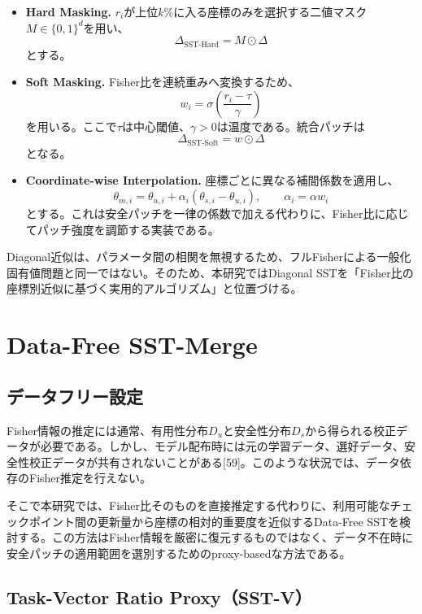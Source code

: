 \documentclass{article}
\begin{document}
\begin{itemize}
\item \textbf{Hard Masking.}
  \(r_i\)が上位\(k\%\)に入る座標のみを選択する二値マスク\(M\in\{0,1\}^d\)を用い、
  \[
  \Delta_{\mathrm{SST\text{-}Hard}}
  =
  M\odot\Delta
  \]
  とする。

\item \textbf{Soft Masking.}
  Fisher比を連続重みへ変換するため、
  \[
  w_i
  =
  \sigma\left(
  \frac{r_i-\tau}{\gamma}
  \right)
  \]
  を用いる。ここで\(\tau\)は中心閾値、\(\gamma>0\)は温度である。統合パッチは
  \[
  \Delta_{\mathrm{SST\text{-}Soft}}
  =
  w\odot\Delta
  \]
  となる。

\item \textbf{Coordinate-wise Interpolation.}
  座標ごとに異なる補間係数を適用し、
  \[
  \theta_{m,i}
  =
  \theta_{u,i}
  +
  \alpha_i(\theta_{s,i}-\theta_{u,i}),
  \qquad
  \alpha_i=\alpha w_i
  \]
  とする。これは安全パッチを一律の係数で加える代わりに、Fisher比に応じてパッチ強度を調節する実装である。
\end{itemize}

Diagonal近似は、パラメータ間の相関を無視するため、フルFisherによる一般化固有値問題と同一ではない。そのため、本研究ではDiagonal SSTを「Fisher比の座標別近似に基づく実用的アルゴリズム」と位置づける。

\section{Data-Free SST-Merge}
\label{app:data-free-sst}

\subsection{データフリー設定}

Fisher情報の推定には通常、有用性分布\(D_u\)と安全性分布\(D_s\)から得られる校正データが必要である。しかし、モデル配布時には元の学習データ、選好データ、安全性校正データが共有されないことがある[59]。このような状況では、データ依存のFisher推定を行えない。

そこで本研究では、Fisher比そのものを直接推定する代わりに、利用可能なチェックポイント間の更新量から座標の相対的重要度を近似するData-Free SSTを検討する。この方法はFisher情報を厳密に復元するものではなく、データ不在時に安全パッチの適用範囲を選別するためのproxy-basedな方法である。

\subsection{Task-Vector Ratio Proxy（SST-V）}
\end{document}
